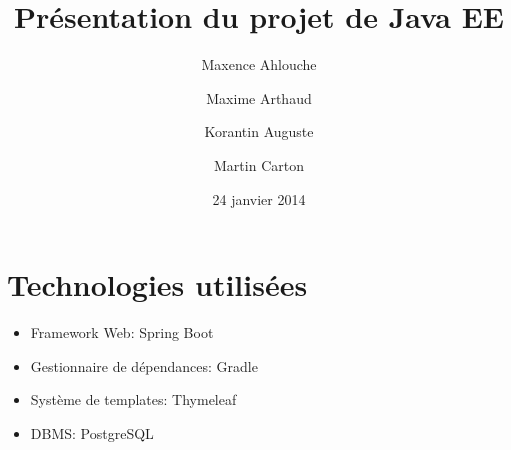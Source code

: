 \documentclass{beamer}
\title{Présentation du projet de Java EE}
\institute{Enseeiht}
\author
  [M.\ Ahlouche \and M.\ Arthaud \and K.\ Auguste \and M.\ Carton]
  {Maxence Ahlouche \and Maxime Arthaud \and Korantin Auguste \and Martin Carton}
\date{24 janvier 2014}
\begin{document}
\begin{frame}
  \titlepage
\end{frame}

\section{Technologies utilisées}
\begin{frame}
\begin{itemize}
  \item Framework Web: Spring Boot
  \item Gestionnaire de dépendances: Gradle
  \item Système de templates: Thymeleaf
  \item DBMS: PostgreSQL
\end{itemize}
\end{frame}
\end{document}
